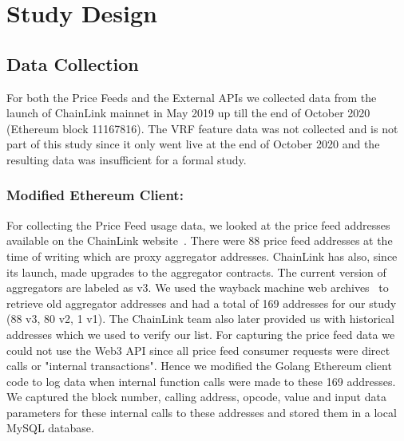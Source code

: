 \documentclass[runningheads]{llncs}
\begin{document}
\section{Study Design}
\subsection{Data Collection}
For both the Price Feeds and the External APIs we collected data from the launch of ChainLink mainnet in May 2019 up till the end of October 2020 (Ethereum block 11167816). The VRF feature data was not collected and is not part of this study since it only went live at the end of October 2020 and the resulting data was insufficient for a formal study.
\subsubsection{Modified Ethereum Client:} For collecting the Price Feed usage data, we looked at the price feed addresses available on the ChainLink website~\cite{chainlinkPriceFeeds}. There were 88 price feed addresses at the time of writing which are proxy aggregator addresses. ChainLink has also, since its launch, made upgrades to the aggregator contracts. The current version of aggregators are labeled as v3. We used the wayback machine web archives~\cite{machine2015internet} to retrieve old aggregator addresses and had a total of 169 addresses for our study (88 v3, 80 v2, 1 v1). The ChainLink team also later provided us with historical addresses which we used to verify our list. For capturing the price feed data we could not use the Web3 API since all price feed consumer requests were direct calls or "internal transactions". Hence we modified the Golang Ethereum client code to log data when internal function calls were made to these 169 addresses. We captured the block number, calling address, opcode, value and input data parameters for these internal calls to these addresses and stored them in a local MySQL database.
\end{document}

